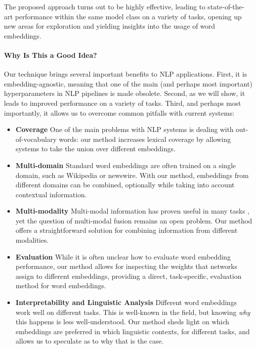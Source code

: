 \documentclass[11pt,a4paper]{article}
\begin{document}
The proposed approach turns out to be highly effective, leading to state-of-the-art performance within the same model class on a variety of tasks, opening up new areas for exploration and yielding insights into the usage of word embeddings.

\paragraph{Why Is This a Good Idea?} Our technique brings several important benefits to NLP applications. First, it is embedding-agnostic, meaning that one of the main (and perhaps most important) hyperparameters in NLP pipelines is made obsolete. Second, as we will show, it leads to improved performance on a variety of tasks. Third, and perhaps most importantly, it allows us to overcome common pitfalls with current systems:

\begin{itemize}
\item \textbf{Coverage} One of the main problems with NLP systems is dealing with out-of-vocabulary words: our method increases lexical coverage by allowing systems to take the union over different embeddings.
\item \textbf{Multi-domain} Standard word embeddings are often trained on a single domain, such as Wikipedia or newswire. With our method, embeddings from different domains can be combined, optionally while taking into account contextual information.
\item \textbf{Multi-modality} Multi-modal information has proven useful in many tasks \cite{Baroni:2016llc,Baltruvsaitis:2018pami}, yet the question of multi-modal fusion remains an open problem. Our method offers a straightforward solution for combining information from different modalities.
\item \textbf{Evaluation} While it is often unclear how to evaluate word embedding performance, our method allows for inspecting the weights that networks assign to different embeddings, providing a direct, task-specific, evaluation method for word embeddings.
\item \textbf{Interpretability and Linguistic Analysis} Different word embeddings work well on different tasks. This is well-known in the field, but knowing \emph{why} this happens is less well-understood. Our method sheds light on which embeddings are preferred in which linguistic contexts, for different tasks, and allows us to speculate as to why that is the case.
\end{itemize}
\end{document}
